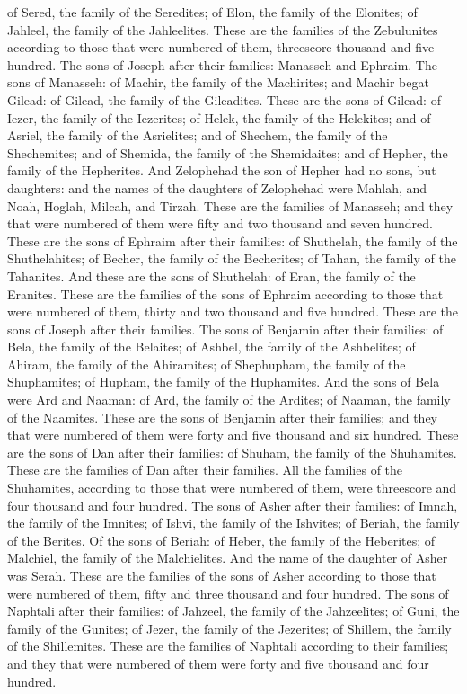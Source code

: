 of Sered, the family of the Seredites; of Elon, the family of the Elonites; of Jahleel, the family of the Jahleelites. These are the families of the Zebulunites according to those that were numbered of them, threescore thousand and five hundred.  The sons of Joseph after their families: Manasseh and Ephraim. The sons of Manasseh: of Machir, the family of the Machirites; and Machir begat Gilead: of Gilead, the family of the Gileadites. These are the sons of Gilead: of Iezer, the family of the Iezerites; of Helek, the family of the Helekites; and of Asriel, the family of the Asrielites; and of Shechem, the family of the Shechemites; and of Shemida, the family of the Shemidaites; and of Hepher, the family of the Hepherites. And Zelophehad the son of Hepher had no sons, but daughters: and the names of the daughters of Zelophehad were Mahlah, and Noah, Hoglah, Milcah, and Tirzah. These are the families of Manasseh; and they that were numbered of them were fifty and two thousand and seven hundred.  These are the sons of Ephraim after their families: of Shuthelah, the family of the Shuthelahites; of Becher, the family of the Becherites; of Tahan, the family of the Tahanites. And these are the sons of Shuthelah: of Eran, the family of the Eranites. These are the families of the sons of Ephraim according to those that were numbered of them, thirty and two thousand and five hundred. These are the sons of Joseph after their families.  The sons of Benjamin after their families: of Bela, the family of the Belaites; of Ashbel, the family of the Ashbelites; of Ahiram, the family of the Ahiramites; of Shephupham, the family of the Shuphamites; of Hupham, the family of the Huphamites. And the sons of Bela were Ard and Naaman: of Ard, the family of the Ardites; of Naaman, the family of the Naamites. These are the sons of Benjamin after their families; and they that were numbered of them were forty and five thousand and six hundred.  These are the sons of Dan after their families: of Shuham, the family of the Shuhamites. These are the families of Dan after their families. All the families of the Shuhamites, according to those that were numbered of them, were threescore and four thousand and four hundred.  The sons of Asher after their families: of Imnah, the family of the Imnites; of Ishvi, the family of the Ishvites; of Beriah, the family of the Berites. Of the sons of Beriah: of Heber, the family of the Heberites; of Malchiel, the family of the Malchielites. And the name of the daughter of Asher was Serah. These are the families of the sons of Asher according to those that were numbered of them, fifty and three thousand and four hundred.  The sons of Naphtali after their families: of Jahzeel, the family of the Jahzeelites; of Guni, the family of the Gunites; of Jezer, the family of the Jezerites; of Shillem, the family of the Shillemites. These are the families of Naphtali according to their families; and they that were numbered of them were forty and five thousand and four hundred.  